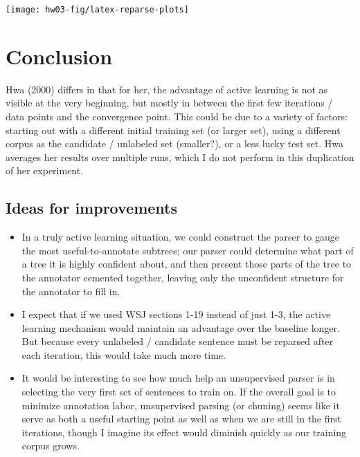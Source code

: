 \documentclass[10pt]{article}\usepackage{graphicx, color}
\newenvironment{knitrout}{}{} %
\begin{document}
\begin{knitrout}\small
{}\color{fgcolor}

{\centering \texttt{[image: hw03-fig/latex-reparse-plots]} 

}



\end{knitrout}



\section{Conclusion}

Hwa (2000) differs in that for her, the advantage of active learning is not as visible at the very beginning, but mostly in between the first few iterations / data points and the convergence point. This could be due to a variety of factors: starting out with a different initial training set (or larger set), using a different corpus as the candidate / unlabeled set (smaller?), or a less lucky test set. Hwa averages her results over multiple runs, which I do not perform in this duplication of her experiment.


\subsection*{Ideas for improvements}

\begin{itemize}
  \item In a truly active learning situation, we could construct the parser to gauge the most useful-to-annotate subtrees; our parser could determine what part of a tree it is highly confident about, and then present those parts of the tree to the annotator cemented together, leaving only the unconfident structure for the annotator to fill in.
  \item I expect that if we used WSJ sections 1-19 instead of just 1-3, the active learning mechanism would maintain an advantage over the baseline longer. But because every unlabeled / candidate sentence must be reparsed after each iteration, this would take much more time.
  \item It would be interesting to see how much help an unsupervised parser is in selecting the very first set of sentences to train on. If the overall goal is to minimize annotation labor, unsupervised parsing (or chuning) seems like it serve as both a useful starting point as well as when we are still in the first iterations, though I imagine its effect would diminish quickly as our training corpus grows.
\end{itemize}
\end{document}
